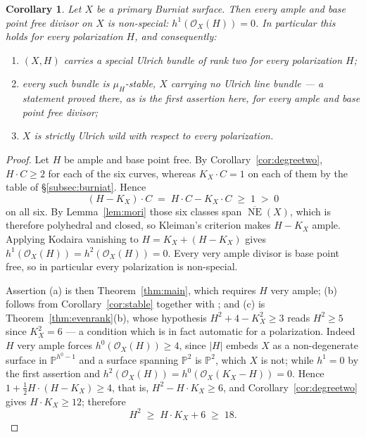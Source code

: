 \documentclass{amsart}
\newtheorem{corollary}[theorem]{Corollary}
\theoremstyle{definition}
\newcommand{\OO}{\mathcal{O}}
\newcommand{\PP}{\mathbb{P}}
\newcommand{\NE}{\overline{\operatorname{NE}}}
\begin{document}
\begin{corollary}\label{cor:burniat-nonspecial}
Let $X$ be a primary Burniat surface. Then \emph{every} ample and base point free divisor on $X$ is non-special: $h^1(\OO_X(H))=0$. In particular this holds for every polarization $H$, and consequently:
\begin{enumerate}[label=\textup{(\alph*)}]
\item $(X,H)$ carries a special Ulrich bundle of rank two for every polarization $H$;
\item every such bundle is $\mu_H$-stable, $X$ carrying no Ulrich line bundle \cite[Thm.~5.5]{Cho26} --- a statement proved there, as is the first assertion here, for every ample and base point free divisor;
\item $X$ is strictly Ulrich wild with respect to \emph{every} polarization.
\end{enumerate}
\end{corollary}

\begin{proof}
Let $H$ be ample and base point free. By Corollary~\ref{cor:degreetwo}, $H\cdot C\ge2$ for each of the six curves, whereas $K_X\cdot C=1$ on each of them by the table of \S\ref{subsec:burniat}. Hence
\[
(H-K_X)\cdot C\;=\;H\cdot C-K_X\cdot C\;\ge\;1\;>\;0
\]
on all six. By Lemma~\ref{lem:mori} those six classes span $\NE(X)$, which is therefore polyhedral and closed, so Kleiman's criterion makes $H-K_X$ ample. Applying Kodaira vanishing to $H=K_X+(H-K_X)$ gives $h^1(\OO_X(H))=h^2(\OO_X(H))=0$. Every very ample divisor is base point free, so in particular every polarization is non-special.

Assertion (a) is then Theorem~\ref{thm:main}, which requires $H$ very ample; (b) follows from Corollary~\ref{cor:stable} together with \cite[Thm.~5.5]{Cho26}; and (c) is Theorem~\ref{thm:evenrank}(b), whose hypothesis $H^2+4-K_X^2\ge3$ reads $H^2\ge5$ since $K_X^2=6$ --- a condition which is in fact automatic for a polarization. Indeed $H$ very ample forces $h^0(\OO_X(H))\ge4$, since $|H|$ embeds $X$ as a non-degenerate surface in $\PP^{h^0-1}$ and a surface spanning $\PP^2$ is $\PP^2$, which $X$ is not; while $h^1=0$ by the first assertion and $h^2(\OO_X(H))=h^0(\OO_X(K_X-H))=0$. Hence $1+\tfrac12H\cdot(H-K_X)\ge4$, that is, $H^2-H\cdot K_X\ge6$, and Corollary~\ref{cor:degreetwo} gives $H\cdot K_X\ge12$; therefore
\[
H^2\;\ge\;H\cdot K_X+6\;\ge\;18 .
\]
\end{proof}
\end{document}
